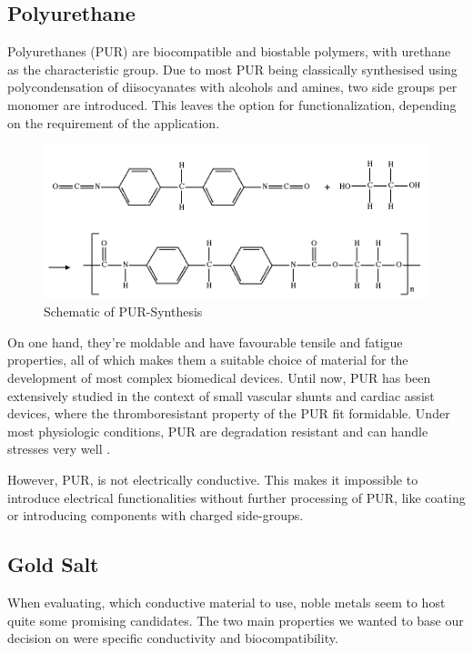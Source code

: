 \subsection{Polyurethane}

Polyurethanes (PUR) are biocompatible and biostable polymers, with urethane as the characteristic group. Due to most PUR being classically synthesised using polycondensation of diisocyanates with alcohols and amines, two side groups per monomer are introduced. This leaves the option for functionalization, depending on the requirement of the application.

\begin{figure}[H]
\centerline{\includegraphics[scale=0.4]{./pic/Polyurethane.png}}
    \caption{Schematic of PUR-Synthesis}
    \label{fig:PURSynth}
\end{figure}

On one hand, they're moldable and have favourable tensile and fatigue properties, all of which makes them a suitable choice of material for the development of most complex biomedical devices. \cite{Pinchuk}
Until now, PUR has been extensively studied in the context of small vascular shunts and cardiac assist devices, where the thromboresistant property of the PUR fit formidable. Under most physiologic conditions, PUR are degradation resistant and can handle stresses very well \cite{Ulery}.

However, PUR, is not electrically conductive. This makes it impossible to introduce electrical functionalities without further processing of PUR, like coating or introducing components with charged side-groups.\cite{Zhu} 

\subsection{Gold Salt}
\label{subsec:GoldSalt}

When evaluating, which conductive material to use, noble metals seem to
host quite some promising candidates. The two main properties we wanted to
base our decision on were specific conductivity and biocompatibility.

